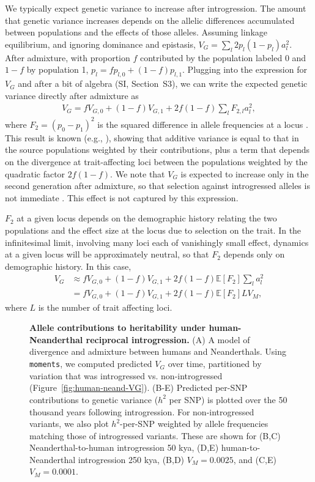\documentclass[10pt,letterpaper]{article}
\newcommand{\moments}{\texttt{moments}\xspace}
\begin{document}
We typically expect genetic variance to increase after introgression. The
amount that genetic variance increases depends on the allelic differences
accumulated between populations and the effects of those alleles. Assuming
linkage equilibrium, and ignoring dominance and epistasis, \(V_G=\sum_l
2p_l(1-p_l)a_l^2\). After admixture, with proportion $f$ contributed by the
population labeled 0 and $1-f$ by population 1, \(p_l = fp_{l,0} +
(1-f)p_{l,1}\). Plugging into the expression for $V_G$ and after a bit of
algebra (SI, Section~S3), we can write the expected genetic
variance directly after admixture as
\begin{align}
V_G = fV_{G,0} + (1-f) V_{G,1} + 2f(1-f)\sum_l F_{2,l} a_l^2,
\end{align}
where $F_2 = (p_0 - p_1)^2$ is the squared difference in allele frequencies at
a locus \cite{peter2016admixture}. This result is known
(e.g., \cite{tufto2000quantitative}), showing that additive variance is equal
to that in the source populations weighted by their contributions, plus a term
that depends on the divergence at trait-affecting loci between the populations
weighted by the quadratic factor $2f(1-f)$. We note that $V_G$ is expected to
increase only in the second generation after admixture, so that selection
against introgressed alleles is not immediate \cite{veller2024stabilizing}.
This effect is not captured by this expression.

$F_2$ at a given locus depends on the demographic history
relating the two populations and the effect size at the locus due to selection
on the trait. In the infinitesimal limit, involving many loci each of
vanishingly small effect, dynamics at a given locus will be approximately
neutral, so that $F_2$ depends only on demographic history. In this case,
\begin{align} \label{eq:VG-admixture}
    V_G & \approx f V_{G,0} + (1-f) V_{G,1} + 2f(1-f)\mathbb{E}[F_2] \sum_l a_l^2 \\
    \nonumber
    & = f V_{G,0} + (1-f) V_{G,1} + 2f(1-f)\mathbb{E}[F_2] L V_M,
\end{align}
where $L$ is the number of trait affecting loci.


\begin{figure}[ht!]
    \centering
    \caption{
        \textbf{Allele contributions to heritability under human-Neanderthal
        reciprocal introgression.}
        (A) A model of divergence and admixture between humans and
        Neanderthals. Using \moments, we computed predicted $V_G$ over time,
        partitioned by variation that was introgressed vs. non-introgressed
        (Figure~\ref{fig:human-neand-VG}).
        (B-E) Predicted per-SNP contributions to genetic variance ($h^2$ per
        SNP) is plotted over the 50 thousand years following introgression.
        For non-introgressed variants, we also plot $h^2$-per-SNP weighted by
        allele frequencies matching those of introgressed variants. These
        are shown for (B,C) Neanderthal-to-human introgression 50 kya,
        (D,E) human-to-Neanderthal introgression 250 kya, (B,D) $V_M=0.0025$,
        and (C,E) $V_M=0.0001$.
    }
    \label{fig:human-neand-h2}
\end{figure}
\end{document}
